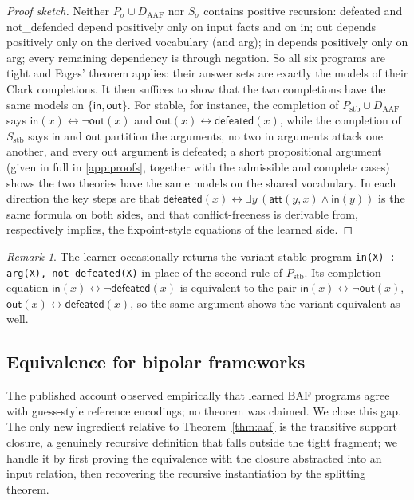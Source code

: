 \documentclass[review,12pt]{elsarticle}
\theoremstyle{definition}
\theoremstyle{remark}
\newtheorem{remark}{Remark}
\newcommand{\pred}[1]{\textsf{#1}}
\newcommand{\Daaf}{D_{\mathrm{AAF}}}
\begin{document}
\begin{proof}[Proof sketch]
Neither $P_\sigma\cup\Daaf$ nor $S_\sigma$ contains positive recursion:
\pred{defeated} and \pred{not\_defended} depend positively only on input
facts and on \pred{in}; \pred{out} depends positively only on the derived
vocabulary (and \pred{arg}); \pred{in} depends positively only on
\pred{arg}; every remaining dependency is through negation. So all six
programs are tight and Fages' theorem applies:
their answer sets are exactly the models of their Clark completions. It then
suffices to show that the two completions have the same models on
$\{\pred{in},\pred{out}\}$. For stable, for instance, the completion of
$P_{\mathrm{stb}}\cup\Daaf$ says $\pred{in}(x)\leftrightarrow\neg\pred{out}(x)$
and $\pred{out}(x)\leftrightarrow\pred{defeated}(x)$, while the completion of
$S_{\mathrm{stb}}$ says $\pred{in}$ and $\pred{out}$ partition the arguments,
no two \pred{in} arguments attack one another, and every \pred{out} argument
is defeated; a short propositional argument (given in full in
\ref{app:proofs}, together with the admissible and complete cases) shows the
two theories have the same models on the shared vocabulary. In each direction
the key steps are that
$\pred{defeated}(x)\leftrightarrow\exists y\,
(\pred{att}(y,x)\wedge\pred{in}(y))$ is the same formula on both sides, and
that conflict-freeness is derivable from, respectively implies, the
fixpoint-style equations of the learned side.
\end{proof}

\begin{remark}
The learner occasionally returns the variant stable program
\texttt{in(X) :- arg(X), not defeated(X)} in place of the second rule of
$P_{\mathrm{stb}}$. Its completion equation
$\pred{in}(x)\leftrightarrow\neg\pred{defeated}(x)$ is equivalent to the pair
$\pred{in}(x)\leftrightarrow\neg\pred{out}(x)$,
$\pred{out}(x)\leftrightarrow\pred{defeated}(x)$, so the same argument shows
the variant equivalent as well.
\end{remark}

\subsection{Equivalence for bipolar frameworks}
\label{sec:thm2}

The published account observed empirically that learned BAF programs agree
with guess-style reference encodings; no theorem was claimed. We close this
gap. The only new ingredient relative to Theorem~\ref{thm:aaf} is the
transitive support closure, a genuinely recursive definition that falls
outside the tight fragment; we handle it by first proving the equivalence with
the closure abstracted into an input relation, then recovering the recursive
instantiation by the splitting theorem.
\end{document}
